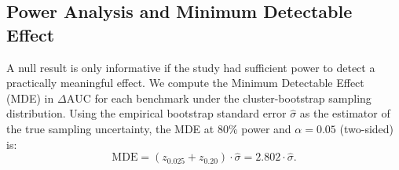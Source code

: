\subsection{Power Analysis and Minimum Detectable Effect}
\label{sec:power}

A null result is only informative if the study had sufficient power to detect a practically meaningful effect. We compute the Minimum Detectable Effect (MDE) in $\Delta\text{AUC}$ for each benchmark under the cluster-bootstrap sampling distribution. Using the empirical bootstrap standard error $\hat{\sigma}$ as the estimator of the true sampling uncertainty, the MDE at 80\% power and $\alpha=0.05$ (two-sided) is:
\begin{equation}
    \mathrm{MDE} = (z_{0.025} + z_{0.20}) \cdot \hat{\sigma} = 2.802 \cdot \hat{\sigma}.
\end{equation}

\begin{table}[ht]
\centering
\small
{}
\caption{\textbf{Power Analysis.} All five benchmarks have $>99\%$ power to detect a $\Delta\text{AUC} = 0.015$ effect given the observed cluster-bootstrap standard errors, confirming that the null findings reflect genuine absence of incremental signal rather than insufficient statistical power.}
\label{tab:power}
\end{table}